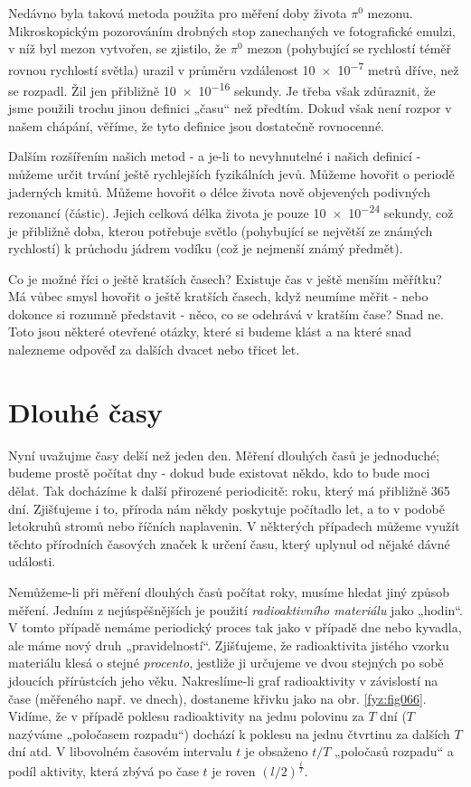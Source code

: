     Nedávno byla taková metoda použita pro měření doby života \(\pi^0\) mezonu. Mikroskopickým 
    pozorováním drobných stop zanechaných ve fotografické emulzi, v níž byl mezon vytvořen, se 
    zjistilo, že \(\pi^0\) mezon (pohybující se rychlostí téměř rovnou rychlostí světla) urazil v 
    průměru vzdálenost \num{10e-7} metrů dříve, než se rozpadl. Žil jen přibližně \num{10e-16} 
    sekundy. Je třeba však zdůraznit, že jsme použili trochu jinou definici „času“ než předtím. 
    Dokud však není rozpor v našem chápání, věříme, že tyto definice jsou dostatečně rovnocenné.
    
    Dalším rozšířením našich metod - a je-li to nevyhnutelné i našich definicí - můžeme určit 
    trvání ještě rychlejších fyzikálních jevů. Můžeme hovořit o periodě jaderných kmitů. Můžeme 
    hovořit o délce života nově objevených podivných rezonancí (částic). Jejich celková délka 
    života je pouze \num{10e-24} sekundy, což je přibližně doba, kterou potřebuje světlo 
    (pohybující se největší ze známých rychlostí) k průchodu jádrem vodíku (což je 
    nejmenší známý předmět).
    
    Co je možné říci o ještě kratších časech? Existuje čas v ještě menším měřítku? Má vůbec smysl 
    hovořit o ještě kratších časech, když neumíme měřit - nebo dokonce si rozumně představit - 
    něco, co se odehrává v kratším čase? Snad ne. Toto jsou některé otevřené otázky, které si 
    budeme klást a na které snad nalezneme odpověď za dalších dvacet nebo třicet let.
    
  \section{Dlouhé časy}
    Nyní uvažujme časy delší než jeden den. Měření dlouhých časů je jednoduché; budeme prostě 
    počítat dny - dokud bude existovat někdo, kdo to bude moci dělat. Tak docházíme k další 
    přirozené periodicitě: roku, který má přibližně \num{365} dní. Zjišťujeme i to, příroda nám 
    někdy poskytuje počítadlo let, a to v podobě letokruhů stromů nebo říčních naplavenin. V 
    některých případech můžeme využít těchto přírodních časových značek k určení času, který 
    uplynul od nějaké dávné události.
    
    Nemůžeme-li při měření dlouhých časů počítat roky, musíme hledat jiný způsob měření. Jedním z 
    nejúspěšnějších je použití \emph{radioaktivního materiálu} jako „hodin“. V tomto případě nemáme 
    periodický proces tak jako v případě dne nebo kyvadla, ale máme nový druh „pravidelností“. 
    Zjišťujeme, že radioaktivita jistého vzorku materiálu klesá o stejné \emph{procento},    
    jestliže ji určujeme ve dvou stejných po sobě jdoucích přírůstcích jeho věku. Nakreslíme-li 
    graf radioaktivity v závislostí na čase (měřeného např. ve dnech), dostaneme křivku jako na 
    obr. \ref{fyz:fig066}. Vidíme, že v případě poklesu radioaktivity na jednu polovinu za \(T\) 
    dní (\(T\) nazýváme „poločasem rozpadu“) dochází k poklesu na jednu čtvrtinu za dalších \(T\) 
    dní atd. V libovolném časovém intervalu \(t\) je obsaženo \(t/T\) „poločasů rozpadu“ a podíl 
    aktivity, která zbývá po čase \(t\) je roven \((l/2)^{\frac{t}{T}}\).

